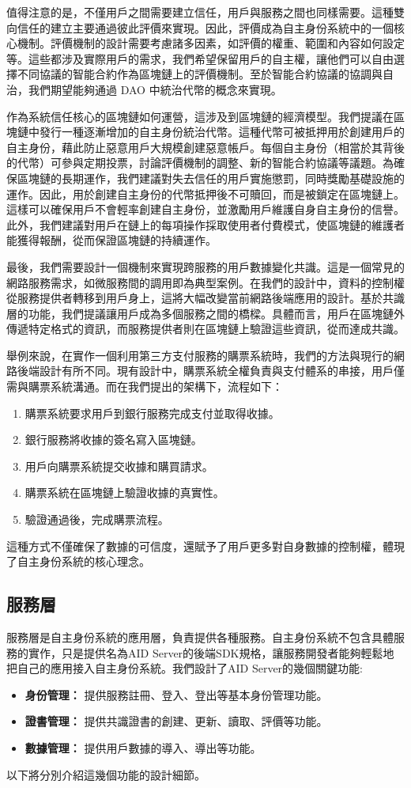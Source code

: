 值得注意的是，不僅用戶之間需要建立信任，用戶與服務之間也同樣需要。這種雙向信任的建立主要通過彼此評價來實現。因此，評價成為自主身份系統中的一個核心機制。評價機制的設計需要考慮諸多因素，如評價的權重、範圍和內容如何設定等。這些都涉及實際用戶的需求，我們希望保留用戶的自主權，讓他們可以自由選擇不同協議的智能合約作為區塊鏈上的評價機制。至於智能合約協議的協調與自治，我們期望能夠通過 DAO 中統治代幣的概念來實現。

作為系統信任核心的區塊鏈如何運營，這涉及到區塊鏈的經濟模型。我們提議在區塊鏈中發行一種逐漸增加的自主身份統治代幣。這種代幣可被抵押用於創建用戶的自主身份，藉此防止惡意用戶大規模創建惡意帳戶。每個自主身份（相當於其背後的代幣）可參與定期投票，討論評價機制的調整、新的智能合約協議等議題。為確保區塊鏈的長期運作，我們建議對失去信任的用戶實施懲罰，同時獎勵基礎設施的運作。因此，用於創建自主身份的代幣抵押後不可贖回，而是被鎖定在區塊鏈上。這樣可以確保用戶不會輕率創建自主身份，並激勵用戶維護自身自主身份的信譽。此外，我們建議對用戶在鏈上的每項操作採取使用者付費模式，使區塊鏈的維護者能獲得報酬，從而保證區塊鏈的持續運作。

最後，我們需要設計一個機制來實現跨服務的用戶數據變化共識。這是一個常見的網路服務需求，如微服務間的調用即為典型案例。在我們的設計中，資料的控制權從服務提供者轉移到用戶身上，這將大幅改變當前網路後端應用的設計。基於共識層的功能，我們提議讓用戶成為多個服務之間的橋樑。具體而言，用戶在區塊鏈外傳遞特定格式的資訊，而服務提供者則在區塊鏈上驗證這些資訊，從而達成共識。

舉例來說，在實作一個利用第三方支付服務的購票系統時，我們的方法與現行的網路後端設計有所不同。現有設計中，購票系統全權負責與支付體系的串接，用戶僅需與購票系統溝通。而在我們提出的架構下，流程如下：
\begin{enumerate}
  \item 購票系統要求用戶到銀行服務完成支付並取得收據。
  \item 銀行服務將收據的簽名寫入區塊鏈。
  \item 用戶向購票系統提交收據和購買請求。
  \item 購票系統在區塊鏈上驗證收據的真實性。
  \item 驗證通過後，完成購票流程。
\end{enumerate}
這種方式不僅確保了數據的可信度，還賦予了用戶更多對自身數據的控制權，體現了自主身份系統的核心理念。
\subsection{服務層}
服務層是自主身份系統的應用層，負責提供各種服務。自主身份系統不包含具體服務的實作，只是提供名為AID Server的後端SDK規格，讓服務開發者能夠輕鬆地把自己的應用接入自主身份系統。我們設計了AID Server的幾個關鍵功能:
\begin{itemize}
  \item \textbf{身份管理：} 提供服務註冊、登入、登出等基本身份管理功能。
  \item \textbf{證書管理：} 提供共識證書的創建、更新、讀取、評價等功能。
  \item \textbf{數據管理：} 提供用戶數據的導入、導出等功能。
\end{itemize}
以下將分別介紹這幾個功能的設計細節。
